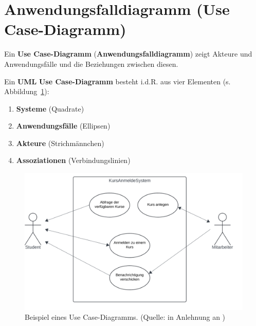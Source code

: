 \section{Anwendungsfalldiagramm (Use Case-Diagramm)}

\begin{tcolorbox}[title=Anwendungsfalldiagramm]
    Ein \textbf{Use Case-Diagramm} (\textbf{Anwendungsfalldiagramm}) zeigt Akteure und Anwendungsfälle und die Beziehungen zwischen diesen.


\noindent
Ein \textbf{UML} \textbf{Use Case-Diagramm} besteht i.d.R. aus vier Elementen (s. Abbildung~\ref{fig:usecasediagram}):

\begin{enumerate}
    \item \textbf{Systeme} (Quadrate)
    \item \textbf{Anwendungsfälle} (Ellipsen)
    \item \textbf{Akteure} (Strichmännchen)
    \item \textbf{Assoziationen} (Verbindungslinien)
\end{enumerate}
\end{tcolorbox}

\begin{figure}
    \centering
    \includegraphics[scale=0.4]{chapters/Anhang/CheatSheets/img/usecasediagram}
    \caption{Beispiel eines Use Case-Diagramms. (Quelle: in Anlehnung an \cite[Figure A-1]{Mar03})}
    \label{fig:usecasediagram}
\end{figure}